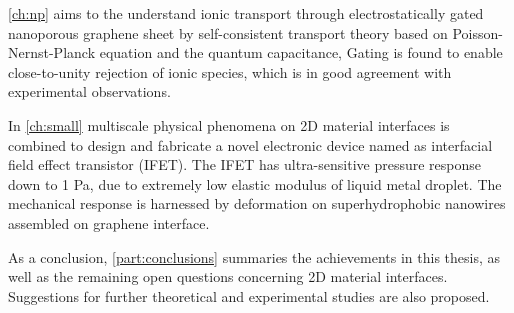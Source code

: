 \autoref{ch:np} aims to the understand ionic transport through
electrostatically gated nano\-porous graphene sheet by
self-consistent transport theory based on Poisson-Nernst-Planck
equation and the quantum capacitance, Gating is found to enable
close-to-unity rejection of ionic species, which is in good agreement
with experimental observations.
%

In \autoref{ch:small} multiscale physical phenomena on 2D material
interfaces is combined to design and fabricate a novel electronic
device named as interfacial field effect transistor (IFET). The IFET
has ultra-sensitive pressure response down to 1 Pa, due to extremely
low elastic modulus of liquid metal droplet. The mechanical response
is harnessed by deformation on superhydrophobic nanowires assembled on
graphene interface.

As a conclusion, \autoref{part:conclusions} summaries the achievements
in this thesis, as well as the remaining open questions concerning 2D
material interfaces. Suggestions for further theoretical and
experimental studies are also proposed.


